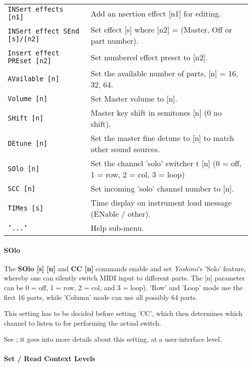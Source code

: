\begin{table}[H]
\begin{tabular}{l l}
\texttt{INSert effects [n1]} &
   Add an nsertion effect [n1] for editing. \\
\texttt{INSert effect SEnd [s]/[n2]} &
   Set effect [s] where [n2] = (Master, Off or part number). \\
\texttt{Insert effect PREset [n2]} &
   Set numbered effect preset to [n2]. \\
\texttt{AVailable [n]} &
   Set the available number of parts, [n] = 16, 32, 64. \\
\texttt{Volume [n]} &
   Set Master volume to [n]. \\
\texttt{SHift [n]} &
   Master key shift in semitones [n] (0 no shift). \\
\texttt{DEtune [n]} &
   Set the master fine detune to [n] to match other sound sources. \\
\texttt{SOlo [n]} &
   Set the channel 'solo' switcher t [n]
   (0 = off, 1 = row, 2 = col, 3 = loop) \\
\texttt{SCC [n]} &
   Set incoming 'solo' channel number to [n]. \\
\texttt{TIMes [s]} &
   Time display on instrument load message (ENable / other). \\
\texttt{'...'} &
   Help sub-menu. \\

      \end{tabular}
   \end{table}

\paragraph{SOlo}
\label{paragraph:command_line_solo}

   The \textbf{SOlo [s] [n]} and \textbf{CC [n]}
   commands enable and set \textsl{Yoshimi}'s 'Solo' feature,
   whereby one can silently switch MIDI input to different parts.
   The [n] parameter can be 0 = off, 1 = row, 2 = col, and 3 = loop).
   'Row' and 'Loop' mode use the first 16 parts, while
   'Column' mode can use all possibly 64 parts.

   This setting has to be decided before setting 'CC', which then determines
   which channel to listen to for performing the actual switch.

   See ; it goes into more details about
   this setting, at a user-interface level.

\paragraph{Set / Read Context Levels}
\label{paragraph:command_line_context_levels}

